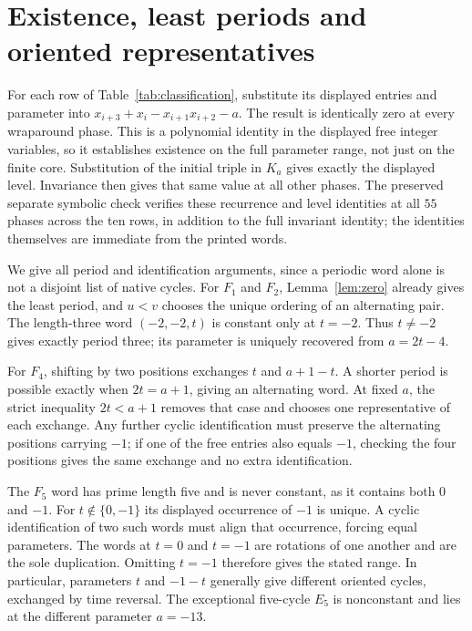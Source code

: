 \section{Existence, least periods and oriented representatives}
\label{sec:least}

For each row of Table~\ref{tab:classification}, substitute its
displayed entries and parameter into
$x_{i+3}+x_i-x_{i+1}x_{i+2}-a$. The result is identically
zero at every wraparound phase. This is a polynomial identity
in the displayed free integer variables, so it establishes
existence on the full parameter range, not just on the finite
core. Substitution of the initial triple in $K_a$ gives exactly
the displayed level. Invariance then gives that same value at
all other phases. The preserved separate symbolic check verifies
these recurrence and level identities at all $55$ phases across
the ten rows, in addition to the full invariant identity;
the identities themselves are immediate from the printed words.

We give all period and identification arguments, since a periodic
word alone is not a disjoint list of native cycles.
For $F_1$ and $F_2$, Lemma~\ref{lem:zero} already gives
the least period, and $u<v$ chooses the unique ordering of an
alternating pair. The length-three word $(-2,-2,t)$ is constant
only at $t=-2$. Thus $t\ne-2$ gives exactly period three;
its parameter is uniquely recovered from $a=2t-4$.

For $F_4$, shifting by two positions exchanges $t$ and
$a+1-t$. A shorter period is possible exactly when
$2t=a+1$, giving an alternating word. At fixed $a$, the
strict inequality $2t<a+1$ removes that case and chooses
one representative of each exchange. Any further cyclic
identification must preserve the alternating positions carrying
$-1$; if one of the free entries also equals $-1$, checking
the four positions gives the same exchange and no extra
identification.

The $F_5$ word has prime length five and is never constant,
as it contains both $0$ and $-1$. For
$t\notin\{0,-1\}$ its displayed occurrence of $-1$ is
unique. A cyclic identification of two such words must align
that occurrence, forcing equal parameters. The words at $t=0$
and $t=-1$ are rotations of one another and are the sole
duplication. Omitting $t=-1$ therefore gives the stated range.
In particular, parameters $t$ and $-1-t$ generally give
different oriented cycles, exchanged by time reversal. The
exceptional five-cycle $E_5$ is nonconstant and lies at
the different parameter $a=-13$.


